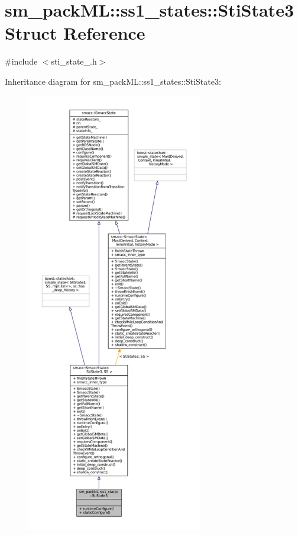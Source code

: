 \hypertarget{structsm__packML_1_1ss1__states_1_1StiState3}{}\section{sm\+\_\+pack\+ML\+:\+:ss1\+\_\+states\+:\+:Sti\+State3 Struct Reference}
\label{structsm__packML_1_1ss1__states_1_1StiState3}


{\ttfamily \#include $<$sti\+\_\+state\+\_.\+h$>$}



Inheritance diagram for sm\+\_\+pack\+ML\+:\+:ss1\+\_\+states\+:\+:Sti\+State3\+:
\nopagebreak
\begin{figure}[H]
\begin{center}
\leavevmode
\includegraphics[height=550pt]{structsm__packML_1_1ss1__states_1_1StiState3__inherit__graph}
\end{center}
\end{figure}



